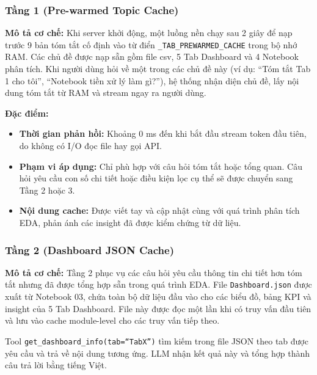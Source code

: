 \subsubsection{Tầng 1 (Pre-warmed Topic Cache)}
\label{subsubsec:tier1_cache}

\noindent\textbf{Mô tả cơ chế:}
Khi server khởi động, một luồng nền chạy sau 2 giây để nạp trước 9 bản tóm tắt cố định vào từ điển \texttt{\_TAB\_PREWARMED\_CACHE} trong bộ nhớ RAM. Các chủ đề được nạp sẵn gồm file csv, 5 Tab Dashboard và 4 Notebook phân tích. Khi người dùng hỏi về một trong các chủ đề này (ví dụ: ``Tóm tắt Tab 1 cho tôi'', ``Notebook tiền xử lý làm gì?''), hệ thống nhận diện chủ đề, lấy nội dung tóm tắt từ RAM và stream ngay ra người dùng.

\noindent\textbf{Đặc điểm:}
\begin{itemize}
    \item \textbf{Thời gian phản hồi:} Khoảng 0 ms đến khi bắt đầu stream token đầu tiên, do không có I/O đọc file hay gọi API.
    \item \textbf{Phạm vi áp dụng:} Chỉ phù hợp với câu hỏi tóm tắt hoặc tổng quan. Câu hỏi yêu cầu con số chi tiết hoặc điều kiện lọc cụ thể sẽ được chuyển sang Tầng 2 hoặc 3.
    \item \textbf{Nội dung cache:} Được viết tay và cập nhật cùng với quá trình phân tích EDA, phản ánh các insight đã được kiểm chứng từ dữ liệu.
\end{itemize}

\subsubsection{Tầng 2 (Dashboard JSON Cache)}
\label{subsubsec:tier2_dashboard}

\noindent\textbf{Mô tả cơ chế:}
Tầng 2 phục vụ các câu hỏi yêu cầu thông tin chi tiết hơn tóm tắt nhưng đã được tổng hợp sẵn trong quá trình EDA. File \texttt{Dashboard.json} được xuất từ Notebook 03, chứa toàn bộ dữ liệu đầu vào cho các biểu đồ, bảng KPI và insight của 5 Tab Dashboard. File này được đọc một lần khi có truy vấn đầu tiên và lưu vào cache module-level cho các truy vấn tiếp theo.

Tool \texttt{get\_dashboard\_info(tab=``TabX'')} tìm kiếm trong file JSON theo tab được yêu cầu và trả về nội dung tương ứng. LLM nhận kết quả này và tổng hợp thành câu trả lời bằng tiếng Việt.

